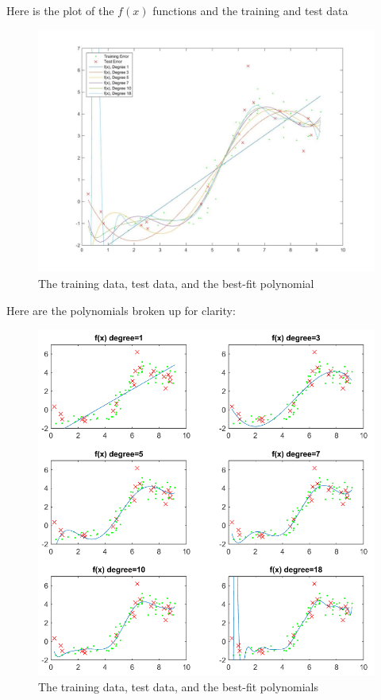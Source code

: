 \documentclass[twoside,11pt]{article}
\theoremstyle{definition}
\begin{document}

Here is the plot of the $f(x)$ functions and the training and test data
\begin{figure}[h]
\centering
\includegraphics[width=5 in]{prob1cPlotA.jpg}
\caption{The training data, test data, and the best-fit polynomial}
\end{figure}
\newpage
Here are the polynomials broken up for clarity:
\begin{figure}[h]
\centering
\includegraphics[width=6 in]{prob1cPlotAalt.png}
\caption{The training data, test data, and the best-fit polynomials}
\end{figure}
\end{document}
